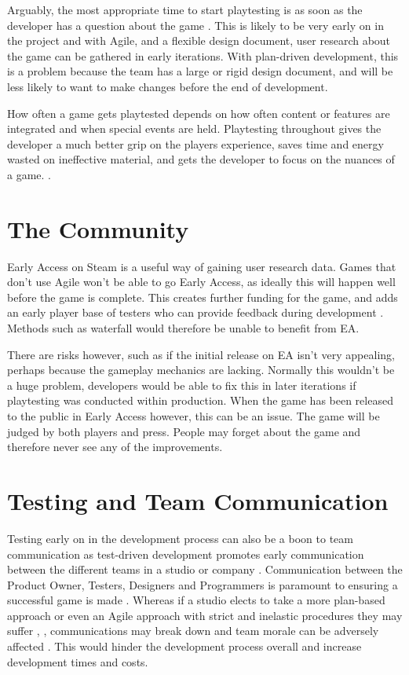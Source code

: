 \documentclass{scrartcl}
\begin{document}
Arguably, the most appropriate time to start playtesting is as soon as the developer has a question about the game \cite{GDCSharks:14}. This is likely to be very early on in the project and with Agile, and a flexible design document, user research about the game can be gathered in early iterations. With plan-driven development, this is a problem because the team has a large or rigid design document, and will be less likely to want to make changes before the end of development. \par
How often a game gets playtested depends on how often content or features are integrated and when special events are held. Playtesting throughout gives the developer a much better grip on the players experience, saves time and energy wasted on ineffective material, and gets the developer to focus on the nuances of a game. \cite{GDCAED:15}.


\section{The Community}

Early Access on Steam is a useful way of gaining user research data\cite{GamesEA:16}. 
Games that don't use Agile won't be able to go Early Access, as ideally this will happen well before the game is complete. This creates further funding for the game, and adds an early player base of testers who can provide feedback during development \cite{GDCOTC:5}. Methods such as waterfall would therefore be unable to benefit from EA. \par

There are risks however, such as if the initial release on EA isn't very appealing, perhaps because the gameplay mechanics are lacking. Normally this wouldn't be a huge problem, developers would be able to fix this in later iterations if playtesting was conducted within production. When the game has been released to the public in Early Access however, this can be an issue. The game will be judged by both players and press. People may forget about the game and therefore never see any of the improvements.

\section{Testing and Team Communication}

Testing early on in the development process can also be a boon to team communication as test-driven development promotes early communication between the different teams in a studio or company \cite{gallardo2009continuous:17}. Communication between the Product Owner, Testers, Designers and Programmers is paramount to ensuring a successful game is made \cite{mcdaniel2015communication:18}. 
Whereas if a studio elects to take a more plan-based approach or even an Agile approach with strict and inelastic procedures they may suffer \cite{cooke2012everything:19},  \cite{davis2012agile:20}, communications may break down and team morale can be adversely affected \cite{cunningham2005costs:11}. This would hinder the development process overall and increase development times and costs.
\end{document}
